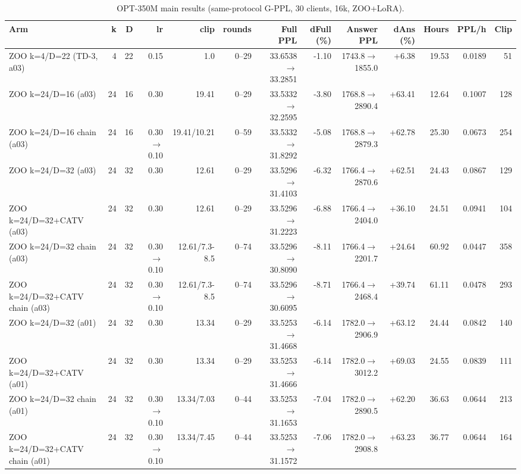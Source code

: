\begin{table}[t]
\centering
\caption{OPT-350M main results (same-protocol G-PPL, 30 clients, 16k, ZOO+LoRA).}
\label{tab:opt-main}
\begin{tabular}{lrrrrrrrrrrrr}
\toprule
Arm & k & D & lr & clip & rounds & Full PPL & dFull (\%) & Answer PPL & dAns (\%) & Hours & PPL/h & Clip \\
\midrule
ZOO k=4/D=22 (TD-3, a03) & 4 & 22 & 0.15 & 1.0 & 0--29 & 33.6538$\to$33.2851 & -1.10 & 1743.8$\to$1855.0 & +6.38 & 19.53 & 0.0189 & 51 \\
ZOO k=24/D=16 (a03) & 24 & 16 & 0.30 & 19.41 & 0--29 & 33.5332$\to$32.2595 & -3.80 & 1768.8$\to$2890.4 & +63.41 & 12.64 & 0.1007 & 128 \\
ZOO k=24/D=16 chain (a03) & 24 & 16 & 0.30$\to$0.10 & 19.41/10.21 & 0--59 & 33.5332$\to$31.8292 & -5.08 & 1768.8$\to$2879.3 & +62.78 & 25.30 & 0.0673 & 254 \\
ZOO k=24/D=32 (a03) & 24 & 32 & 0.30 & 12.61 & 0--29 & 33.5296$\to$31.4103 & -6.32 & 1766.4$\to$2870.6 & +62.51 & 24.43 & 0.0867 & 129 \\
ZOO k=24/D=32+CATV (a03) & 24 & 32 & 0.30 & 12.61 & 0--29 & 33.5296$\to$31.2223 & -6.88 & 1766.4$\to$2404.0 & +36.10 & 24.51 & 0.0941 & 104 \\
ZOO k=24/D=32 chain (a03) & 24 & 32 & 0.30$\to$0.10 & 12.61/7.3-8.5 & 0--74 & 33.5296$\to$30.8090 & -8.11 & 1766.4$\to$2201.7 & +24.64 & 60.92 & 0.0447 & 358 \\
ZOO k=24/D=32+CATV chain (a03) & 24 & 32 & 0.30$\to$0.10 & 12.61/7.3-8.5 & 0--74 & 33.5296$\to$30.6095 & -8.71 & 1766.4$\to$2468.4 & +39.74 & 61.11 & 0.0478 & 293 \\
ZOO k=24/D=32 (a01) & 24 & 32 & 0.30 & 13.34 & 0--29 & 33.5253$\to$31.4668 & -6.14 & 1782.0$\to$2906.9 & +63.12 & 24.44 & 0.0842 & 140 \\
ZOO k=24/D=32+CATV (a01) & 24 & 32 & 0.30 & 13.34 & 0--29 & 33.5253$\to$31.4666 & -6.14 & 1782.0$\to$3012.2 & +69.03 & 24.55 & 0.0839 & 111 \\
ZOO k=24/D=32 chain (a01) & 24 & 32 & 0.30$\to$0.10 & 13.34/7.03 & 0--44 & 33.5253$\to$31.1653 & -7.04 & 1782.0$\to$2890.5 & +62.20 & 36.63 & 0.0644 & 213 \\
ZOO k=24/D=32+CATV chain (a01) & 24 & 32 & 0.30$\to$0.10 & 13.34/7.45 & 0--44 & 33.5253$\to$31.1572 & -7.06 & 1782.0$\to$2908.8 & +63.23 & 36.77 & 0.0644 & 164 \\
\bottomrule
\end{tabular}
\end{table}
